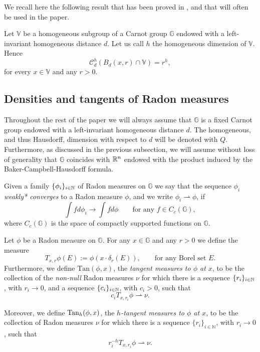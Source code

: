\documentclass[10pt, a4paper,
oneside, headinclude,footinclude]{scrartcl}
\begin{document}
We recall here the following result that has been proved in \cite[item (iii) of Proposition 2.11]{antonelli2020rectifiable}, and that will often be used in the paper.
\begin{lemma}\label{lemma:PALLAUNITARIAVOLUMEUNO}
Let $\mathbb V$ be a homogeneous subgroup of a Carnot group $\mathbb G$ endowed with a left-invariant homogeneous distance $d$. Let us call $h$ the homogeneous dimension of $\mathbb V$. Hence 
$$
\mathcal{C}^h_d(B_d(x,r)\cap\mathbb V)=r^h,
$$
for every $x\in\mathbb V$ and any $r>0$.
\end{lemma}


\subsection{Densities and tangents of Radon measures}

Throughout the rest of  the paper we will always assume that $\mathbb{G}$ is a fixed Carnot group endowed with a left-invariant homogeneous distance $d$. The homogeneous, and thus Hausdorff, dimension with respect to $d$ will be denoted with $Q$. Furthermore, as discussed in the previous subsection, we will assume without loss of generality that $\mathbb{G}$ coincides with $\mathbb{R}^n$ endowed with the product induced by the Baker-Campbell-Hausdorff formula.


\begin{definizione}\label{def:WeakConvergence}
Given a family $\{\phi_i\}_{i\in\mathbb{N}}$ of Radon measures on $\mathbb{G}$ we say that the sequence $\phi_i$ {\em weakly* converges} to a Radon measure $\phi$, and we write $\phi_i\rightharpoonup \phi$, if
$$
\int fd \phi_i \to \int fd\phi \qquad\text{for any } f\in C_c(\mathbb G),
$$
where $C_c(\mathbb G)$ is the space of compactly supported functions on $\mathbb G$.
\end{definizione}

\begin{definizione}\label{def:TangentMeasure}
Let $\phi$ be a Radon measure on $\mathbb G$. For any $x\in\mathbb G$ and any $r>0$ we define the measure
$$
T_{x,r}\phi(E):=\phi(x\cdot\delta_r(E)), \qquad\text{for any Borel set }E.
$$
Furthermore, we define $\mathrm{Tan}(\phi,x)$, the {\em tangent measures to $\phi$ at $x$}, to be the collection of the \emph{non-null} Radon measures $\nu$ for which there is a sequence $\{r_i\}_{i\in\mathbb{N}}$, with $r_i\to 0$, and a sequence $\{c_i\}_{i\in\mathbb{N}}$, with $c_i>0$, such that
$$c_iT_{x,r_i}\phi\rightharpoonup \nu.$$

Moreover, we define $\mathrm{Tan}_h(\phi,x)$, the {\em $h$-tangent measures to $\phi$ at $x$}, to be the collection of Radon measures $\nu$ for which there is a sequence $\{r_i\}_{i\in\mathbb N}$, with $r_i\to 0$, such that 
$$
r_i^{-h}T_{x,r_i}\phi\rightharpoonup \nu.
$$
\end{definizione}
\end{document}

